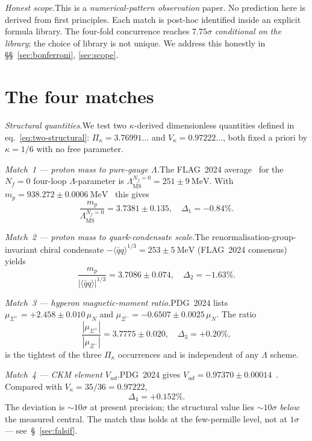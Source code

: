 \documentclass[aps,prl,reprint,amsmath,amssymb,nofootinbib,floatfix,superscriptaddress]{revtex4-2}
\newcommand{\msbar}{\overline{\mathrm{MS}}}
\newcommand{\Piskappa}{\Pi_{\kappa}}
\newcommand{\Vskappa}{V_{\kappa}}
\newcommand{\LambdaPG}{\Lambda^{N_f = 0}_{\msbar}}
\newcommand{\muN}{\mu_N}
\begin{document}
\textit{Honest scope.}\quad This is a \emph{numerical-pattern observation} paper. No prediction here is derived from first principles. Each match is post-hoc identified inside an explicit formula library. The four-fold concurrence reaches $7.75\sigma$ \emph{conditional on the library}; the choice of library is not unique. We address this honestly in \S\S~\ref{sec:bonferroni}, \ref{sec:scope}.

\section{The four matches}
\label{sec:matches}

\textit{Structural quantities.}\quad We test two $\kappa$-derived dimensionless quantities defined in eq.~\eqref{eq:two-structural}: $\Piskappa = 3.76991\ldots$ and $\Vskappa = 0.97222\ldots$, both fixed a priori by $\kappa = 1/6$ with no free parameter.

\textit{Match~1 --- proton mass to pure-gauge $\Lambda$.}\quad The FLAG~2024 average~\cite{FLAG2024} for the $N_f = 0$ four-loop $\Lambda$-parameter is $\LambdaPG = 251 \pm 9~\mathrm{MeV}$. With $m_p = 938.272 \pm 0.0006~\mathrm{MeV}$~\cite{PDG2024} this gives
\begin{equation}
\frac{m_p}{\LambdaPG} = 3.7381 \pm 0.135,
\quad
\Delta_1 = -0.84\%.
\label{eq:match1}
\end{equation}

\textit{Match~2 --- proton mass to quark-condensate scale.}\quad The renormalisation-group-invariant chiral condensate $-\langle \bar{q}q\rangle^{1/3} = 253 \pm 5~\mathrm{MeV}$ (FLAG~2024 consensus) yields
\begin{equation}
\frac{m_p}{|\langle\bar{q}q\rangle|^{1/3}} = 3.7086 \pm 0.074,
\quad
\Delta_2 = -1.63\%.
\label{eq:match2}
\end{equation}

\textit{Match~3 --- hyperon magnetic-moment ratio.}\quad PDG~2024 lists $\mu_{\Sigma^+} = +2.458 \pm 0.010\,\muN$ and $\mu_{\Xi^-} = -0.6507 \pm 0.0025\,\muN$. The ratio
\begin{equation}
\frac{|\mu_{\Sigma^+}|}{|\mu_{\Xi^-}|} = 3.7775 \pm 0.020,
\quad
\Delta_3 = +0.20\%,
\label{eq:match3}
\end{equation}
is the tightest of the three $\Piskappa$ occurrences and is independent of any $\Lambda$ scheme.

\textit{Match~4 --- CKM element $V_{ud}$.}\quad PDG~2024 gives $V_{ud} = 0.97370 \pm 0.00014$~\cite{HardyTowner2020}. Compared with $\Vskappa = 35/36 = 0.97222$,
\begin{equation}
\Delta_4 = +0.152\%.
\label{eq:match4}
\end{equation}
The deviation is ${\sim}10\sigma$ at present precision; the structural value lies $\sim 10\sigma$ \emph{below} the measured central. The match thus holds at the few-permille level, not at $1\sigma$ --- see~\S~\ref{sec:falsif}.
\end{document}
